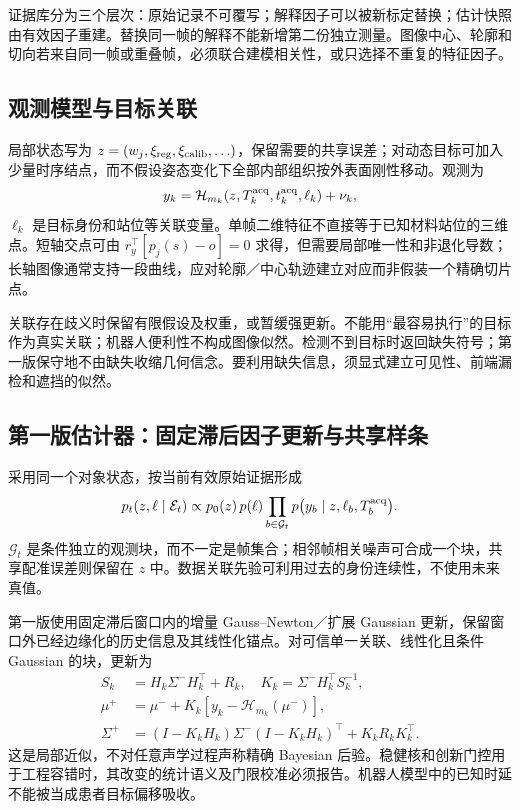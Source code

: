 \documentclass[UTF8,11pt,a4paper,fontset=fandol]{ctexart}
\numberwithin{equation}{section}
\theoremstyle{definition}
\begin{document}
证据库分为三个层次：原始记录不可覆写；解释因子可以被新标定替换；估计快照由有效因子重建。替换同一帧的解释不能新增第二份独立测量。图像中心、轮廓和切向若来自同一帧或重叠帧，必须联合建模相关性，或只选择不重复的特征因子。

\subsection{观测模型与目标关联}
局部状态写为 $z=(w_j,\xi_{\rm reg},\xi_{\rm calib},\ldots)$，保留需要的共享误差；对动态目标可加入少量时序结点，而不假设姿态变化下全部内部组织按外表面刚性移动。观测为
\begin{equation}
y_k=\mathcal H_{m_k}(z,T_k^{\rm acq},t_k^{\rm acq},\ell_k)+\nu_k,
\label{eq:obs}
\end{equation}
$\ell_k$ 是目标身份和站位等关联变量。单帧二维特征不直接等于已知材料站位的三维点。短轴交点可由 $r_y^\top[p_j(s)-o]=0$ 求得，但需要局部唯一性和非退化导数；长轴图像通常支持一段曲线，应对轮廓／中心轨迹建立对应而非假装一个精确切片点。

关联存在歧义时保留有限假设及权重，或暂缓强更新。不能用“最容易执行”的目标作为真实关联；机器人便利性不构成图像似然。检测不到目标时返回缺失符号；第一版保守地不由缺失收缩几何信念。要利用缺失信息，须显式建立可见性、前端漏检和遮挡的似然。

\subsection{第一版估计器：固定滞后因子更新与共享样条}
采用同一个对象状态，按当前有效原始证据形成
\begin{equation}
p_t(z,\ell\mid\mathcal E_t)\propto
p_0(z)\,p(\ell)\prod_{b\in\mathcal G_t}
 p\bigl(y_b\mid z,\ell_b,T_b^{\rm acq}\bigr).
\label{eq:posterior}
\end{equation}
$\mathcal G_t$ 是条件独立的观测块，而不一定是帧集合；相邻帧相关噪声可合成一个块，共享配准误差则保留在 $z$ 中。数据关联先验可利用过去的身份连续性，不使用未来真值。

第一版使用固定滞后窗口内的增量 Gauss--Newton／扩展 Gaussian 更新，保留窗口外已经边缘化的历史信息及其线性化锚点。对可信单一关联、线性化且条件 Gaussian 的块，更新为
\begin{align}
S_k&=H_k\Sigma^-H_k^\top+R_k,\quad
K_k=\Sigma^-H_k^\top S_k^{-1},\\
\mu^+&=\mu^-+K_k[y_k-\mathcal H_{m_k}(\mu^-)],\\
\Sigma^+&=(I-K_kH_k)\Sigma^-(I-K_kH_k)^\top+K_kR_kK_k^\top.
\label{eq:filter}
\end{align}
这是局部近似，不对任意声学过程声称精确 Bayesian 后验。稳健核和创新门控用于工程容错时，其改变的统计语义及门限校准必须报告。机器人模型中的已知时延不能被当成患者目标偏移吸收。
\end{document}
